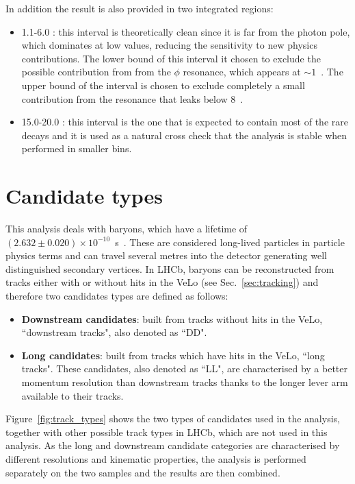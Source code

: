 In addition the result is also provided in two integrated regions:
\begin{itemize}
\item 1.1-6.0 \gevgevcccc: this interval is theoretically clean since it is far from the
photon pole, which dominates at low \qsq values, reducing the sensitivity to new physics contributions.
The lower bound of this interval it chosen to exclude the possible contribution from
from the $\phi$ resonance, which appears at $\sim1$~\gevgevcccc. The upper bound of the interval
is chosen to exclude completely a small contribution from the \jpsi resonance that leaks
below 8~\gevgevcccc.
\item 15.0-20.0 \gevgevcccc: this interval is the one that is expected to contain most of the
rare decays and it is used as a natural cross check that the analysis is stable when performed in smaller bins.
\end{itemize}

\section{Candidate types}

This analysis deals with \Lz baryons, which have a lifetime of \mbox{$(2.632 \pm 0.020 ) \times 10^{-10}$ s~\cite{PDG2014}}.
These are considered long-lived particles in particle physics terms and can travel several metres into the
detector generating well distinguished secondary vertices.
In LHCb, \Lz baryons can be reconstructed from tracks either with or without hits in the VeLo (see Sec.~\ref{sec:tracking}) and
therefore two candidates types are defined as follows:

\begin{itemize}
\item {\bf Downstream candidates}: built from tracks without hits in the VeLo, 
``downstream tracks", also denoted as ``DD".
\item {\bf Long candidates}: built from tracks which have hits in the VeLo, ``long tracks".
These candidates, also denoted as ``LL", are characterised by a better momentum resolution
than downstream tracks thanks to the longer lever arm available to their tracks.
\end{itemize}

Figure~\ref{fig:track_types} shows the two types of candidates used in the analysis,
together with other possible track types in LHCb, which are not used in this analysis.
As the long and downstream candidate categories are characterised by different resolutions and 
kinematic properties, the analysis is performed separately on the two samples and the results are then combined.

